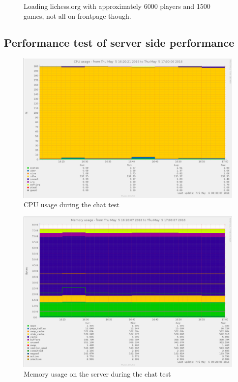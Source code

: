 \begin{figure}[h!]
    \caption{Loading lichess.org with approximately 6000 players and 1500 games, not all on frontpage though.}
    \label{fig:my_label}
\end{figure}

\subsection{Performance test of server side performance}
\begin{figure}
    \includegraphics[width=\textwidth]{figure/serversidePerformance/2016-05-05-chatting-test-cpu.png}
    \caption{CPU usage during the chat test}
    \label{fig:cpu-results-attachment}
\end{figure}

\begin{figure}
    \includegraphics[width=\textwidth]{figure/serversidePerformance/2016-05-05-chat-memory.png}
    \caption{Memory usage on the server during the chat test}
    \label{fig:memory-results-attachment}
\end{figure}


